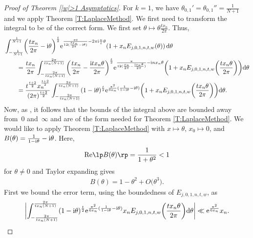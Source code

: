 \begin{proof}[Proof of Theorem \ref{|w|>1 Asymptotics}]
For $k=1$, we have $\theta_{0,1}'=\theta_{0,1}''=\frac{1}{N+1}$ and we apply Theorem \ref{T:LaplaceMethod}.
We first need to transform the integral to be of the correct form. We first set $\theta \mapsto \theta \frac{tx_n}{2\pi}$. Thus,
\begin{align}
 &\int_{-\frac{1}{N+1}}^{\frac{1}{N+1}} \biggl(\frac{tx_n}{2\pi}-{\rm i}\theta\biggr)^{\frac{t}{2}}{\rm e}^{\frac{\pi t}{12(\frac{tx_n}{2\pi}-{\rm i}\theta)}-2\pi {\rm i} \frac{n}{t} \theta} (1+x_n E_{j,0,1,n,t,w}(\theta)) \,{\rm d}\theta \nonumber \\
 &\qquad{}=\frac{tx_n}{2\pi}\int_{-\frac{2\pi}{tx_n(N+1)}}^{\frac{2\pi}{tx_n(N+1)}} \biggl(\frac{tx_n}{2\pi}-\frac{{\rm i}tx_n\theta}{2\pi}\biggr)^{\frac{t}{2}}{\rm e}^{\frac{\pi}{12(\frac{x_n}{2\pi}-\frac{{\rm i}x_n\theta}{2\pi})}- {\rm i} nx_n \theta} \biggl(1+x_n E_{j,0,1,n,t,w}\biggl(\frac{tx_n\theta}{2\pi}\biggr)\biggr) {\rm d}\theta \nonumber \\
 &\qquad{}=\frac{t^{\frac{t+2}{2}}x_n^{\frac{t+2}{2}}}{(2\pi)^{\frac{t+2}{2}}}\int_{-\frac{2\pi}{tx_n(N+1)}}^{\frac{2\pi}{tx_n(N+1)}} (1-{\rm i}\theta)^{\frac{t}{2}}{\rm e}^{\frac{\pi^2}{6x_n}( \frac{1}{1-{\rm i}\theta}- {\rm i} \theta)} \biggl(1+x_n E_{j,0,1,n,t,w}\biggl(\frac{tx_n\theta}{2\pi}\biggr)\biggr) {\rm d}\theta. \label{E:MainRewrite}
\end{align}
Now, as , it follows that the bounds of the integral above are bounded away from~0 and~$\infty$ and are of the form needed for Theorem \ref{T:LaplaceMethod}. We would like to apply Theorem \ref{T:LaplaceMethod} with $x\mapsto \theta$, $x_0\mapsto 0$,  and $B(\theta)=\frac{1}{1-{\rm i}\theta}- {\rm i} \theta$. Here,
\begin{align*}
 \mathrm{Re} \lp B(\theta) \rp = \frac{1}{1+\theta^2}< 1
\end{align*}
for $\theta \neq 0$ and Taylor expanding gives
\begin{align*}
 B(\theta)=1-\theta^2+O\big(\theta^3\big).
\end{align*}
First we bound the error term, using the boundedness of $E_{j,0,1,n,t,w}$, as
\begin{equation}\label{E:MainTerm}
\biggl|\int_{-\frac{2\pi}{tx_n(N+1)}}^{\frac{2\pi}{tx_n(N+1)}} (1-{\rm i}\theta)^{\frac{t}{2}}{\rm e}^{\frac{\pi^2}{6x_n}( \frac{1}{1-{\rm i}\theta}- {\rm i}\theta)} x_n E_{j,0,1,n,t,w}\biggl(\frac{tx_n\theta}{2\pi}\biggr) {\rm d}\theta \biggr| \ll {\rm e}^{\frac{\pi^2}{6x_n}}x_n.
\end{equation}

\end{proof}

